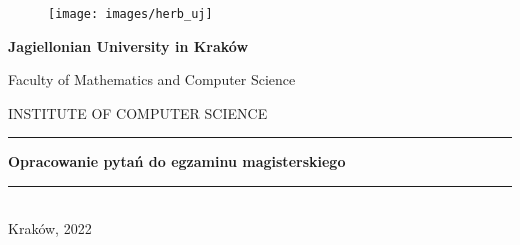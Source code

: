 \begin{titlepage}

    \begin{figure}
        \centering
        \texttt{[image: images/herb\_uj]}
    \end{figure}

    \begin{center}

        \renewcommand{\baselinestretch}{1}
        \large{\textbf{Jagiellonian University in Kraków}}
        \smallskip

        \normalsize{Faculty of Mathematics and Computer Science}
        \smallskip

        \small{INSTITUTE OF COMPUTER SCIENCE}
        \renewcommand{\baselinestretch}{1.5}

        \vspace{1cm}

        \vspace{1cm}
        \hrule
        \vspace{1cm}

        \renewcommand{\baselinestretch}{1}
        \LARGE{\textbf{Opracowanie pytań do egzaminu magisterskiego}}
        \renewcommand{\baselinestretch}{1.5}

        \vspace{1cm}
        \hrule
        \vspace{1cm}

    \end{center}

    \bigskip
    \bigskip

    \renewcommand{\arraystretch}{0.85}
    \begin{tabularx}{0.7\textwidth}{
            >{\raggedright\arraybackslash}X
            >{\raggedright\arraybackslash}X }
%
    \end{tabularx}

    \vfill

    \begin{center}
        \normalsize{Kraków, 2022}
    \end{center}

\end{titlepage}
